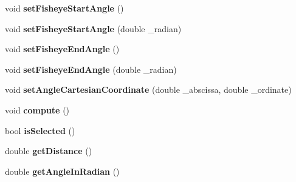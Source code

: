 \begin{DoxyCompactItemize}
\item 
\hypertarget{class_ambisonic_virtual_mic_u_i_ac889cb803bad6ee739cb11d54f90742c}{void {\bfseries set\-Fisheye\-Start\-Angle} ()}\label{class_ambisonic_virtual_mic_u_i_ac889cb803bad6ee739cb11d54f90742c}

\item 
\hypertarget{class_ambisonic_virtual_mic_u_i_aa0c5a139c501bf786df871b5c053ec4c}{void {\bfseries set\-Fisheye\-Start\-Angle} (double \-\_\-radian)}\label{class_ambisonic_virtual_mic_u_i_aa0c5a139c501bf786df871b5c053ec4c}

\item 
\hypertarget{class_ambisonic_virtual_mic_u_i_a267198e45ef3735eb9a381b4c42d2673}{void {\bfseries set\-Fisheye\-End\-Angle} ()}\label{class_ambisonic_virtual_mic_u_i_a267198e45ef3735eb9a381b4c42d2673}

\item 
\hypertarget{class_ambisonic_virtual_mic_u_i_a3987b765c3675811c438fc694a0202aa}{void {\bfseries set\-Fisheye\-End\-Angle} (double \-\_\-radian)}\label{class_ambisonic_virtual_mic_u_i_a3987b765c3675811c438fc694a0202aa}

\item 
\hypertarget{class_ambisonic_virtual_mic_u_i_ab84edcfc26bc9cf0f6ce9e9446d83d2a}{void {\bfseries set\-Angle\-Cartesian\-Coordinate} (double \-\_\-abscissa, double \-\_\-ordinate)}\label{class_ambisonic_virtual_mic_u_i_ab84edcfc26bc9cf0f6ce9e9446d83d2a}

\item 
\hypertarget{class_ambisonic_virtual_mic_u_i_a96aa92f166ff5d5ee83a6f0e7032933a}{void {\bfseries compute} ()}\label{class_ambisonic_virtual_mic_u_i_a96aa92f166ff5d5ee83a6f0e7032933a}

\item 
\hypertarget{class_ambisonic_virtual_mic_u_i_adb3df82c075cd6624242a76611423dfc}{bool {\bfseries is\-Selected} ()}\label{class_ambisonic_virtual_mic_u_i_adb3df82c075cd6624242a76611423dfc}

\item 
\hypertarget{class_ambisonic_virtual_mic_u_i_ae4e538c9a0181d8e7f776a0aec549d31}{double {\bfseries get\-Distance} ()}\label{class_ambisonic_virtual_mic_u_i_ae4e538c9a0181d8e7f776a0aec549d31}

\item 
\hypertarget{class_ambisonic_virtual_mic_u_i_ae96b1865c6fe4b5c4a4c9e816e3651ca}{double {\bfseries get\-Angle\-In\-Radian} ()}\label{class_ambisonic_virtual_mic_u_i_ae96b1865c6fe4b5c4a4c9e816e3651ca}


\end{DoxyCompactItemize}
